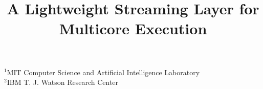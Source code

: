 %
%
%
%
%
%
%
%
%
%
%
%
% 
% 
\title{A Lightweight Streaming Layer for Multicore Execution}

           {$^1$MIT Computer Science and Artificial Intelligence Laboratory\\
            $^2$IBM T. J. Watson Research Center}
           {}
\maketitle

